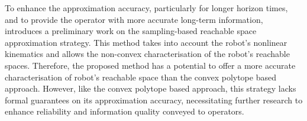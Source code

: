 
To enhance the approximation accuracy, particularly for longer horizon times, and to provide the operator with more accurate long-term information,  introduces a preliminary work on the sampling-based reachable space approximation strategy. This method takes into account the robot's nonlinear kinematics and allows the non-convex characterisation of the robot's reachable spaces. Therefore, the proposed method has a potential to offer a more accurate characterisation of robot's reachable space than the convex polytope based approach. However, like the convex polytope based approach, this strategy lacks formal guarantees on its approximation accuracy, necessitating further research to enhance reliability and information quality conveyed to operators. 

